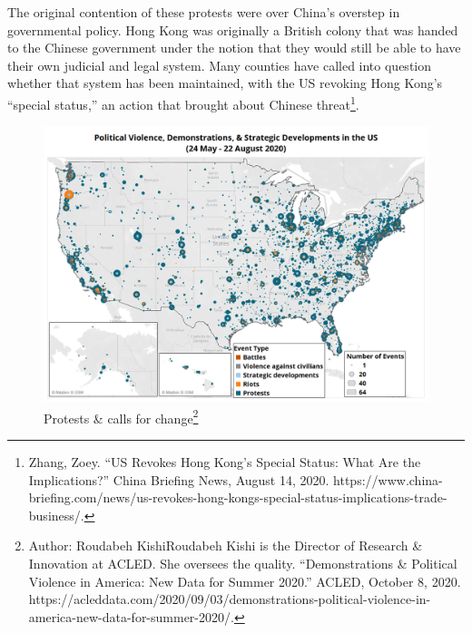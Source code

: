 \documentclass[10pt, letterpaper]{article}
\begin{document}
The original contention of these protests were over China's overstep in
governmental policy. Hong Kong was originally a British colony that was
handed to the Chinese government under the notion that they would still
be able to have their own judicial and legal system. Many counties have
called into question whether that system has been maintained, with the
US revoking Hong Kong's ``special status,'' an action that brought about
Chinese threat\footnote{Zhang, Zoey. ``US Revokes Hong Kong's Special
  Status: What Are the Implications?'' China Briefing News, August 14,
  2020.
  https://www.china-briefing.com/news/us-revokes-hong-kongs-special-status-implications-trade-business/.}. \\

\begin{figure}
\centering
\includegraphics[scale = 0.2]{image5.png}
\caption{Protests \& calls for change\footnote{Author:
  Roudabeh KishiRoudabeh Kishi is the Director of Research \& Innovation
  at ACLED. She oversees the quality. ``Demonstrations \& Political
  Violence in America: New Data for Summer 2020.'' ACLED, October 8,
  2020.
  https://acleddata.com/2020/09/03/demonstrations-political-violence-in-america-new-data-for-summer-2020/.}}
\end{figure}
\end{document}
